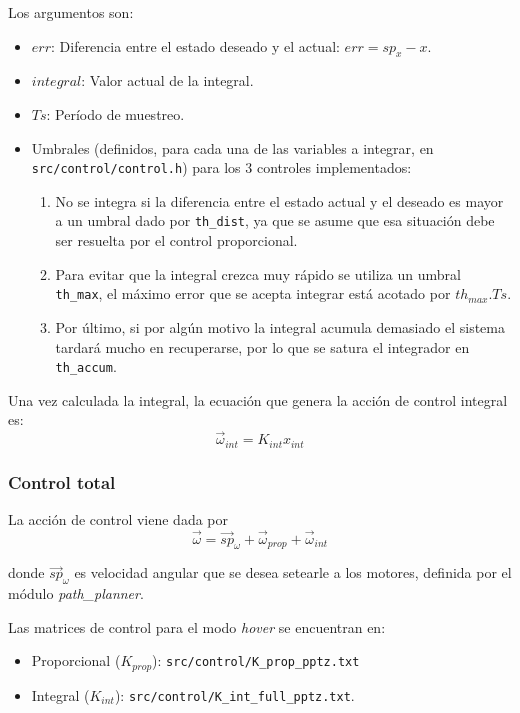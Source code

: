 \documentclass[main]{subfiles}
\begin{document}
Los argumentos son:
\begin{itemize}
\item $err$: Diferencia entre el estado deseado y el actual: $err = sp_{x} - x$.
\item $integral$: Valor actual de la integral.
\item $Ts$: Per\'iodo de muestreo.
\item Umbrales (definidos, para cada una de las variables a integrar, en \newline\verb+src/control/control.h+) para los 3 controles implementados:
  \begin{enumerate}
  \item No se integra si la diferencia entre el estado actual y el deseado es mayor a un umbral dado por \verb+th_dist+, ya que se asume que esa situaci\'on debe ser resuelta por el control proporcional.
  \item Para evitar que la integral crezca muy r\'apido se utiliza un umbral \verb+th_max+, el m\'aximo error que se acepta integrar est\'a acotado por $th_{max}.Ts$.
  \item Por \'ultimo, si por alg\'un motivo la integral acumula demasiado el sistema tardar\'a mucho en recuperarse, por lo que se satura el integrador en \verb+th_accum+.
\end{enumerate}
\end{itemize}

Una vez calculada la integral, la ecuaci\'on que genera la acci\'on de control integral es:
\begin{equation}
  \label{eq:software:int}
  \vec{\omega}_{int} = K_{int} x_{int}
\end{equation}

\subsubsection{Control total}
\label{sec:software:control-total}

La acci\'on de control viene dada por
\begin{equation}
  \label{eq:software:control}
  \vec{\omega} = \vec{sp}_\omega + \vec{\omega}_{prop} + \vec{\omega}_{int}
\end{equation}

donde $\vec{sp}_\omega$ es velocidad angular que se desea setearle a los motores, definida por el m\'odulo \textit{path\_planner}.

Las matrices de control para el modo \textit{hover} se encuentran en:
\begin{itemize}
\item Proporcional ($K_{prop}$): \verb+src/control/K_prop_pptz.txt+
\item Integral ($K_{int}$): \verb+src/control/K_int_full_pptz.txt+.
\end{itemize}
\end{document}
